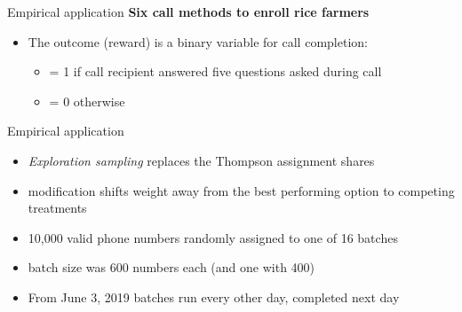 \documentclass[11pt,table]{beamer}
\begin{document}
\begin{frame}{Empirical application \citep{Kasy2021}}
\textbf{Six call methods to enroll rice farmers} 
\renewcommand{\baselinestretch}{1}

\begin{itemize}
\item The outcome (reward) is a binary variable for call completion:
\begin{itemize}
    \item = 1 if call recipient answered five questions asked during call
    \item = 0 otherwise
\end{itemize}

\end{itemize}
\centering
\begin{minipage}[c]{0.8\textwidth}
\end{minipage}


\end{frame}


\begin{frame}{Empirical application \citep{Kasy2021}}
\renewcommand{\baselinestretch}{1}

\begin{itemize}
\item \emph{Exploration sampling} replaces the Thompson assignment shares
\item modification shifts weight away from the best performing option to competing treatments
\item 10,000 valid phone numbers randomly assigned to one of 16 batches
\item batch size was 600 numbers each (and one with 400)
\item From June 3, 2019 batches run every other day, completed next day
\end{itemize}

\end{frame}
\end{document}

